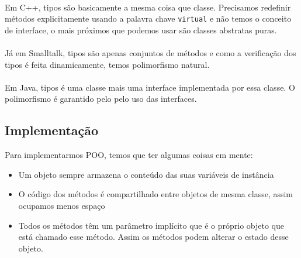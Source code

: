 \documentclass[11pt]{article}
\begin{document}
\paragraph{} Em C++, tipos são basicamente a mesma coisa que classe. Precisamos redefinir métodos explicitamente usando a palavra chave
\texttt{virtual} e não temos o conceito de interface, o mais próximos que podemos usar são classes abstratas puras.

\paragraph{} Já em Smalltalk, tipos são apenas conjuntos de métodos e como a verificação dos tipos é feita dinamicamente, temos
polimorfismo natural.

\paragraph{} Em Java, tipos é uma classe mais uma interface implementada por essa classe. O polimorfismo é garantido pelo pelo uso das
interfaces.

\subsection{Implementação}
\label{sec:org64ec4a0}
Para implementarmos POO, temos que ter algumas coisas em mente:

\begin{itemize}
\item Um objeto sempre armazena o conteúdo das suas variáveis de instância
\item O código dos métodos é compartilhado entre objetos de mesma classe, assim ocupamos menos espaço
\item Todos os métodos têm um parâmetro implícito que é o próprio objeto que está chamado esse método. Assim os métodos podem alterar o estado desse objeto.
\end{itemize}
\end{document}
